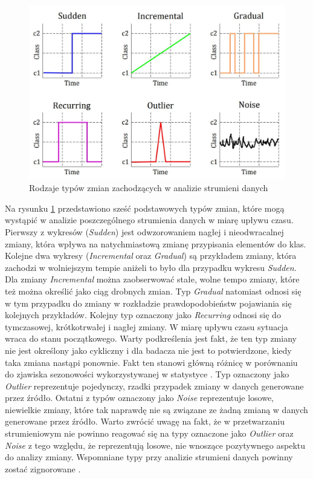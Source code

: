 \begin{figure}[h] 
    \centering
    \includegraphics[width=14cm]{figures/types_of_drift2.JPG}
    \caption{Rodzaje typów zmian zachodzących w analizie strumieni danych \cite{Article:DriftType4}}\label{Figure:DriftTypes}
\end{figure}

\noindent Na rysunku \ref{Figure:DriftTypes} przedstawiono sześć podstawowych typów zmian, które mogą wystąpić w analizie poszczególnego strumienia danych w miarę upływu czasu. Pierwszy z wykresów (\textit{Sudden}) jest odwzorowaniem nagłej i nieodwracalnej zmiany, która wpływa na natychmiastową zmianę przypisania elementów do klas. Kolejne dwa wykresy (\textit{Incremental} oraz \textit{Gradual}) są przykładem zmiany, która zachodzi w wolniejszym tempie aniżeli to było dla przypadku wykresu \textit{Sudden}. Dla zmiany \textit{Incremental} można zaobserwować stałe, wolne tempo zmiany, które też można określić jako ciąg drobnych zmian. Typ \textit{Gradual} natomiast odnosi się w tym przypadku do zmiany w rozkładzie prawdopodobieństw pojawiania się kolejnych przykładów. Kolejny typ oznaczony jako \textit{Recurring} odnosi się do tymczasowej, krótkotrwałej i nagłej zmiany. W miarę upływu czasu sytuacja wraca do stanu początkowego. Warty podkreślenia jest fakt, że ten typ zmiany nie jest określony jako cykliczny i dla badacza nie jest to potwierdzone, kiedy taka zmiana nastąpi ponownie. Fakt ten stanowi główną różnicę w porównaniu do zjawiska sezonowości wykorzystywanej w statystyce \cite{PHD:Zliobaite}. Typ oznaczony jako \textit{Outlier} reprezentuje pojedynczy, rzadki przypadek zmiany w danych generowane przez źródło. Ostatni z typów oznaczony jako \textit{Noise} reprezentuje losowe, niewielkie zmiany, które tak naprawdę nie są związane ze żadną zmianą w danych generowane przez źródło. Warto zwrócić uwagę na fakt, że w przetwarzaniu strumieniowym nie powinno reagować się na typy oznaczone jako \textit{Outlier} oraz \textit{Noise} z tego względu, że reprezentują losowe, nie wnoszące pozytywnego aspektu do analizy zmiany. Wspomniane typy przy analizie strumieni danych powinny zostać zignorowane \cite{DBrzezinski}\cite{Prezentacja:Strumienie}.

